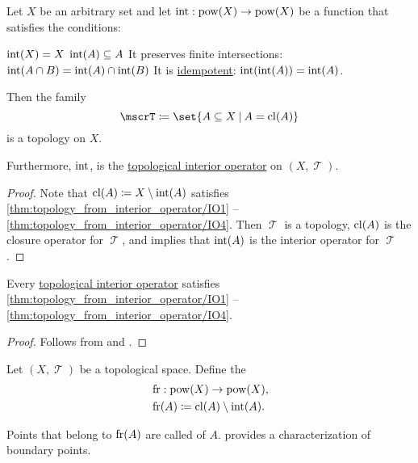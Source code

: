 \begin{proposition}\label{thm:topology_from_interior_operator}
  Let \( X \) be an arbitrary set and let \( \operatorname{int}: \operatorname{pow}(X) \to \operatorname{pow}(X) \) be a function that satisfies the conditions:
  \begin{thmenum}
     \( \operatorname{int}(X) = X \)
     \( \operatorname{int}(A) \subseteq A \)
     It preserves finite intersections: \( \operatorname{int}(A \cap B) = \operatorname{int}(A) \cap \operatorname{int}(B) \)
     It is \hyperref[def:magma/idempotent]{idempotent}: \( \operatorname{int}(\operatorname{int}(A)) = \operatorname{int}(A) \).
  \end{thmenum}

  Then the family
  \begin{equation*}
    \mscrT \coloneqq \set{ A \subseteq X \given A = \cl(A) }
  \end{equation*}
  is a topology on \( X \).

  Furthermore, \( \operatorname{int} \), is the \hyperref[def:topological_interior_operator]{topological interior operator} on \( (X, \mscrT) \).
\end{proposition}
\begin{proof}
  Note that \( \operatorname{cl}(A) \coloneqq X \setminus \operatorname{int}(A) \) satisfies \ref{thm:topology_from_interior_operator/IO1} -- \ref{thm:topology_from_interior_operator/IO4}. Then \( \mscrT \) is a topology, \( \operatorname{cl}(A) \) is the closure operator for \( \mscrT \), and  implies that \( \operatorname{int}(A) \) is the interior operator for \( \mscrT \).
\end{proof}

\begin{proposition}\label{thm:topological_interior_operator_can_generate_topology}
  Every \hyperref[def:topological_interior_operator]{topological interior operator} satisfies \ref{thm:topology_from_interior_operator/IO1} -- \ref{thm:topology_from_interior_operator/IO4}.
\end{proposition}
\begin{proof}
  Follows from  and .
\end{proof}

\begin{definition}\label{def:topological_boundary_operator}
  Let \( (X, \mscrT) \) be a topological space. Define the 
  \begin{equation*}
    \begin{aligned}
      &\operatorname{fr}: \operatorname{pow}(X) \to \operatorname{pow}(X), \\
      &\operatorname{fr}(A) \coloneqq \operatorname{cl}(A) \setminus \operatorname{int}(A).
    \end{aligned}
  \end{equation*}

  Points that belong to \( \operatorname{fr}(A) \) are called  of \( A \).  provides a characterization of boundary points.
\end{definition}


